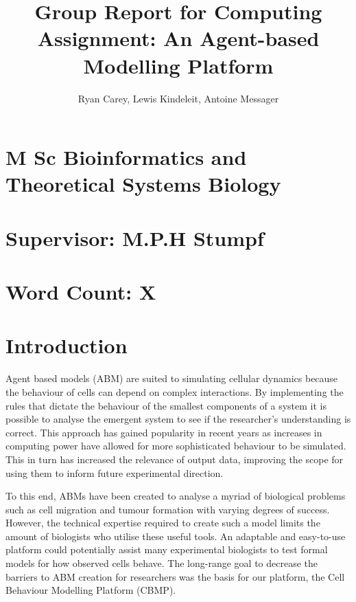 \documentclass[12pt]{article}
\title{Group Report for Computing Assignment: An Agent-based Modelling Platform}
\author{Ryan Carey, Lewis Kindeleit, Antoine Messager}
\begin{document}
\maketitle
\section*{M Sc Bioinformatics and Theoretical Systems Biology}
\section*{Supervisor: M.P.H Stumpf} 
\section{Word Count: X}

\newpage
\tableofcontents
\newpage
\section{Introduction}
Agent based models (ABM) are suited to simulating cellular dynamics because the behaviour of cells can 
depend on complex interactions.\cite{kaul15} By implementing the rules 
that dictate the behaviour of the smallest components of a system it is possible to analyse the emergent 
system to see if the researcher’s understanding is correct. This approach has gained popularity in recent 
years as increases in computing power have allowed for more sophisticated behaviour to be simulated. 
This in turn has increased the relevance of output data, improving the scope for using them to inform 
future experimental direction. \cite{grimm06} \cite{drasdo07}

To this end, ABMs have been created to analyse a myriad of biological problems such as cell migration 
and tumour formation with varying degrees of success. However, the technical expertise required to 
create such a model limits the amount of biologists who utilise these useful tools. An adaptable and 
easy-to-use platform could potentially assist many experimental biologists to test formal models for 
how observed cells behave. The long-range goal to decrease the barriers to  ABM creation for researchers 
was the basis for our platform, the Cell Behaviour Modelling Platform (CBMP).
\end{document}
